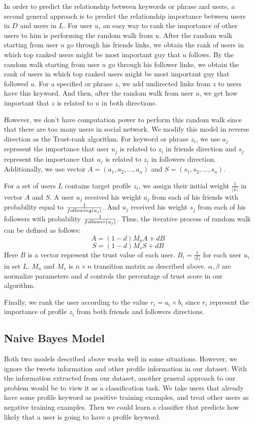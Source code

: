 \documentclass{article}
\begin{document}
In order to predict the relationship between keywords or phrase and users, a second general approach is to predict the relationship importance between users in $D$ and users in $L$. For user $u$, an easy way to rank the importance of other users to him is performing the random walk from $u$. After the random walk starting from user $u$ go through his friends links, we obtain the rank of users in which top ranked users might be most important guy that $u$ follows. By the random walk starting from user $u$ go through his follower links, we obtain the rank of users in which top ranked users might be most important guy that followed $u$. For a specified or phrase $z$, we add undirected links from $z$ to users have this keyword. And then, after the random walk from user $u$, we get how important that $z$ is related to $u$ in both directions.

However, we don't have computation power to perform this random walk since that there are too many users in social network. We modify this model in reverse direction as the Trust-rank algorithm. For keyword or phrase $z_i$, we use $a_j$ represent the importance that user $u_j$ is related to $z_i$ in friends direction and $s_j$ represent the importance that $u_j$ is related to $z_i$ in followers direction. Additionally, we use vector $A=(a_1, a_2, ..., a_n)$ and $S=(s_1, s_2, ..., s_n)$.

For a set of users $L$ contains target profile $z_i$, we assign their initial weight $\frac{1}{|L|}$ in vector $A$ and $S$. A user $u_j$ received his weight $a_j$ from each of his friends with probability equal to $\frac{1}{following(u_j)}$. And $u_j$ received his weight $s_j$ from each of his followers with probability $\frac{1}{follower(u_j)}$. Thus, the iterative process of random walk can be defined as follows:
$$A = (1 - d) M_a A + d B$$
$$S = (1 - d) M_s S + d B$$
Here $B$ is a vector represent the trust value of each user. $B_i = \frac{1}{|L|}$ for each user $u_i$ in set $L$. $M_a$ and $M_s$ is $n \times n$ transition matrix as described above. $\alpha, \beta$ are normalize parameters and $d$ controls the percentage of trust score in our algorithm.

Finally, we rank the user according to the value $r_i=a_i \times b_i$ since $r_i$ represent the importance of profile $z_i$ from both friends and followers directions.

\subsection{Naive Bayes Model}
Both two models described above works well in some situations. However, we ignore the tweets information and other profile information in our dataset. With the information extracted from our dataset, another general approach to our problem would be to view it as a classification task. We take users that already have some profile keyword as positive training examples, and treat other users as negative training examples. Then we could learn a classifier that predicts how likely that a user is going to have a profile keyword.
\end{document}
